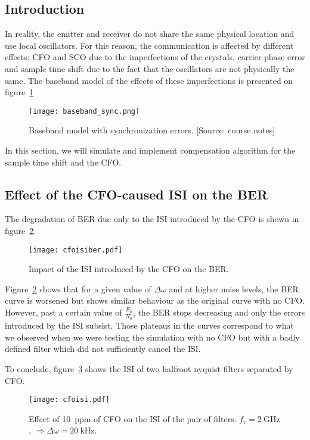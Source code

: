 \subsection{Introduction}
In reality, the emitter and receiver do not share the same physical location and use local oscillators.
For this reason, the communication is affected by different effects: CFO and SCO due to the imperfections of the crystals, carrier phase error and sample time shift due to the fact that the oscillators are not physically the same.
The baseband model of the effects of these imperfections is presented on figure~\ref{fig:sync}
\begin{figure}[htbp]
\texttt{[image: baseband\_sync.png]}
\caption[Baseband model with synchronization errors.]{Baseband model with synchronization errors. [Source: course notes]\label{fig:sync}}
\end{figure}

In this section, we will simulate and implement compensation algorithm for the sample time shift and the CFO.
\subsection{Effect of the CFO-caused ISI on the BER}
The degradation of BER due only to the ISI introduced by the CFO is shown in figure~\ref{fig:cfoisiber}.
\begin{figure}[htbp]
\centering
\texttt{[image: cfoisiber.pdf]}
\caption{Impact of the ISI introduced by the CFO on the BER.\label{fig:cfoisiber}}
\end{figure}
Figure~\ref{fig:cfoisiber} shows that for a given value of $\Delta\omega$ and at higher noise levels, the BER curve is worsened but shows similar behaviour as the original curve with no CFO.
However, past a certain value of $\frac{E_b}{N_0}$, the BER stops decreasing and only the errors introduced by the ISI subsist.
Those plateaus in the curves correspond to what we observed when we were testing the simulation with no CFO but with a badly defined filter which did not sufficiently cancel the ISI.

To conclude, figure~\ref{fig:cfoisi} shows the ISI of two halfroot nyquist filters separated by CFO.
\begin{figure}[htbp]
    \centering
    \texttt{[image: cfoisi.pdf]}
    \caption[Effect of \SI{10}{ppm} of CFO on the ISI of the pair of filters.]{Effect of \SI{10}{ppm} of CFO on the ISI of the pair of filters. $f_c = \SI{2}{\giga\hertz}$, $\Rightarrow \Delta\omega = \SI{20}{\kilo\hertz}$.\label{fig:cfoisi}}
\end{figure}


